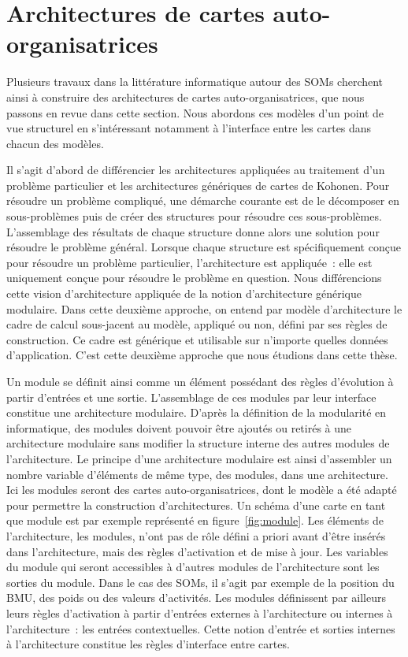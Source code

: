 \documentclass[../main]{subfiles}
\begin{document}
\section{Architectures de cartes auto-organisatrices}

Plusieurs travaux dans la littérature informatique autour des SOMs cherchent ainsi à construire des architectures de cartes auto-organisatrices, que nous passons en revue dans cette section.
Nous abordons ces modèles d'un point de vue structurel en s'intéressant notamment à l'interface entre les cartes dans chacun des modèles.

Il s'agit d'abord de différencier les architectures appliquées au traitement d'un problème particulier et les architectures génériques de cartes de Kohonen.
Pour résoudre un problème compliqué, une démarche courante est de le décomposer en sous-problèmes puis de créer des structures pour résoudre ces sous-problèmes. L'assemblage des résultats de chaque structure donne alors une solution pour résoudre le problème général.
Lorsque chaque structure est spécifiquement conçue pour résoudre un problème particulier, l'architecture est appliquée~: elle est uniquement conçue pour résoudre le problème en question.
Nous différencions cette vision d'architecture appliquée de la notion d'architecture générique modulaire.
Dans cette deuxième approche, on entend par modèle d'architecture le cadre de calcul sous-jacent au modèle, appliqué ou non, défini par ses règles de construction. Ce cadre est générique et utilisable sur n'importe quelles données d'application. 
C'est cette deuxième approche que nous étudions dans cette thèse.

Un module se définit ainsi comme un élément possédant des règles d'évolution à partir d'entrées et une sortie. L'assemblage de ces modules par leur interface constitue une architecture modulaire. D'après la définition de la modularité en informatique, des modules doivent pouvoir être ajoutés ou retirés à une architecture modulaire sans modifier la structure interne des autres modules de l'architecture.
Le principe d'une architecture modulaire est ainsi d'assembler un nombre variable d'éléments de même type, des modules, dans une architecture. Ici les modules seront des cartes auto-organisatrices, dont le modèle a été adapté pour permettre la construction d'architectures. Un schéma d'une carte en tant que module est par exemple représenté en figure~\ref{fig:module}.
Les éléments de l'architecture, les modules, n'ont pas de rôle défini a priori avant d'être insérés dans l'architecture, mais des règles d'activation et de mise à jour.
Les variables du module qui seront accessibles à d'autres modules de l'architecture sont les sorties du module. Dans le cas des SOMs, il s'agit par exemple de la position du BMU, des poids ou des valeurs d'activités.
Les modules définissent par ailleurs leurs règles d'activation à partir d'entrées externes à l'architecture ou internes à l'architecture~: les entrées contextuelles.
Cette notion d'entrée et sorties internes à l'architecture constitue les règles d'interface entre cartes.
\end{document}
